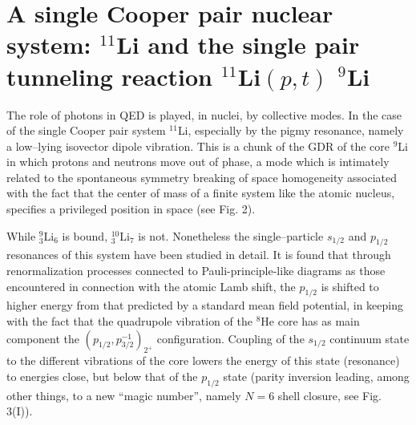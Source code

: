 \documentclass[a4paper,14pt]{book}
\begin{document}
\section{A single Cooper pair nuclear system: ${}^{11}$Li and the single pair tunneling reaction ${}^{11}$Li$(p,t)$ ${}^9$Li}

The role of photons in QED is played, in nuclei, by collective modes. In the case of the single Cooper pair system ${}^{11}$Li, especially by the pigmy resonance, namely a low--lying isovector dipole vibration. This is a chunk of the GDR of the core ${}^9$Li in which protons and neutrons move out of phase, a mode which is intimately related to the spontaneous symmetry breaking of space homogeneity associated with the fact that the center of mass of a finite system like the atomic nucleus, specifies a privileged position in space (see Fig. 2). 



While ${}^9_3$Li${}_6$ is bound, ${}^{10}_3$Li${}_7$ is not. Nonetheless the single--particle $s_{1/2}$ and $p_{1/2}$ resonances of this system have been studied in detail. It is found that through renormalization processes connected to Pauli-principle-like diagrams as those encountered in connection with the atomic Lamb shift, the $p_{1/2}$ is shifted to higher energy from that predicted by a standard mean field potential, in keeping with the fact that the quadrupole vibration of the ${}^8$He core has as main component the $(p_{1/2},p_{3/2}^{-1})_{2^{+}}$ configuration. Coupling of the $s_{1/2}$ continuum state to the different vibrations of the core lowers the energy of this state (resonance) to energies close, but below that of the $p_{1/2}$ state (parity inversion leading, among other things, to a new ``magic number'', namely $N=6$ shell closure, see Fig. 3(I)).
\end{document}
